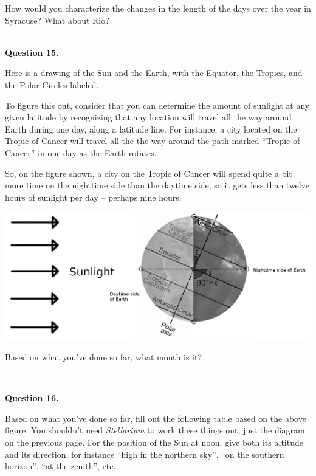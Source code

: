 \documentclass[11pt]{article}
\begin{document}
How would you characterize the changes in the length of the days over the year in Syracuse? What about Rio?

\vspace*{1.5cm}
\hrulefill\\
\newpage
\textbf{Question 15.}

Here is a drawing of the Sun and the Earth, with the Equator, the Tropics, and the Polar Circles labeled.


 To figure this out, consider that you can determine the amount of sunlight at any given
latitude by recognizing that any location will travel all the way around Earth during one day, along a latitude line. For instance,
a city located on the Tropic of Cancer will travel all the the way around the path marked ``Tropic of Cancer'' in one day as the Earth rotates. 

So, on the figure shown, a city on the Tropic of Cancer will spend quite a bit more time on the nighttime side than the daytime side, so it gets less than twelve hours of
sunlight per day -- perhaps nine hours.

\begin{center}
\includegraphics[width=7in]{earth-rotate-figure.jpg}
\end{center}

Based on what you've done so far, what month is it?

\vspace*{1.5cm}
\hrulefill\\

\newpage


\textbf{Question 16.}

Based on what you've done so far, fill out the following table based on the above figure.
 You shouldn't need {\it Stellarium} to work these things out, just the diagram on the previous page. For the position of the Sun
at noon, give both its altitude and its direction, for instance ``high in the northern sky'', ``on the southern horizon'', ``at the zenith'', etc.
\end{document}
